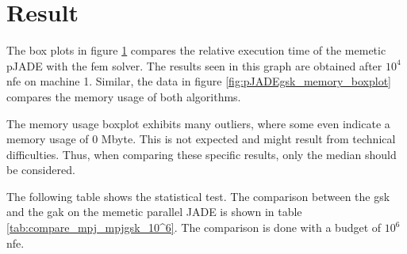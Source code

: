 \documentclass[./\jobname.tex]{subfiles}
\begin{document}
\section{Result}

The box plots in figure \ref{fig:pJADEgsk_time_boxplot} compares the relative execution time of the memetic pJADE with the \gls{fem} solver. The results seen in this graph are obtained after $10^4$ \gls{nfe} on machine 1. Similar, the data in figure \ref{fig:pJADEgsk_memory_boxplot} compares the memory usage of both algorithms. 

The memory usage boxplot exhibits many outliers, where some even indicate a memory usage of 0 Mbyte. This is not expected and might result from technical difficulties. Thus, when comparing these specific results, only the median should be considered. 

The following table shows the statistical test. The comparison between the \gls{gsk} and the \gls{gak} on the memetic parallel JADE is shown in table \ref{tab:compare_mpj_mpjgsk_10^6}. The comparison is done with a budget of $10^6$ \gls{nfe}. 

\begin{figure}[H]
	\centering
	\noindent{}
	\label{fig:pJADEgsk_time_boxplot}
\end{figure}
\end{document}
